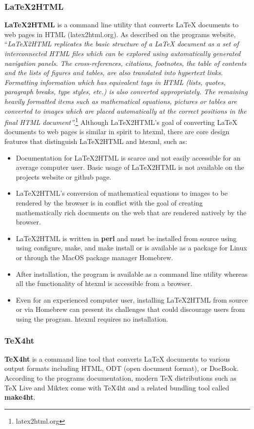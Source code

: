 \documentclass[11pt]{article}
\begin{document}
\subsubsection{LaTeX2HTML}
\textbf{LaTeX2HTML} is a command line utility that converts LaTeX documents to web pages in HTML (latex2html.org).  As described on the programs website, ``\textit{LaTeX2HTML replicates the basic structure of a LaTeX document as a set of interconnected HTML files which can be explored using automatically generated navigation panels. The cross-references, citations, footnotes, the table of contents and the lists of figures and tables, are also translated into hypertext links. Formatting information which has equivalent tags in HTML (lists, quotes, paragraph breaks, type styles, etc.) is also converted appropriately. The remaining heavily formatted items such as mathematical equations, pictures or tables are converted to images which are placed automatically at the correct positions in the final HTML document''.}\footnote{latex2html.org}  Although LaTeX2HTML's goal of converting LaTeX documents to web pages is similar in spirit to htexml, there are core design features that distinguish LaTeX2HTML and htexml, such as:

\begin{itemize}
\item Documentation for LaTeX2HTML is scarce and not easily accessible for an average computer user.  Basic usage of LaTeX2HTML is not available on the projects website or github page.
\item LaTeX2HTML's conversion of mathematical equations to images to be rendered by the browser is in conflict with the goal of creating mathematically rich documents on the web that are rendered natively by the browser.
\item LaTeX2HTML is written in \textbf{perl} and must be installed from source using using configure, make, and make install or is available as a package for Linux or through the MacOS package manager Homebrew.
\item After installation, the program is available as a command line utility whereas all the functionality of htexml is accessible from a browser.
\item Even for an experienced computer user, installing LaTeX2HTML from source or via Homebrew can present its challenges that could discourage users from using the program.  htexml requires no installation.
\end{itemize}

\subsubsection{TeX4ht}
\textbf{TeX4ht} is a command line tool that converts LaTeX documents to various output formats including HTML, ODT (open document format), or DocBook.  According to the programs documentation, modern TeX distributions such as TeX Live and Miktex come with TeX4ht and a related bundling tool called \textbf{make4ht}.  
\end{document}
